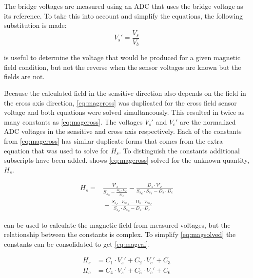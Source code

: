 The bridge voltages are measured using an \ac{ADC} that uses the bridge voltage as its reference. To take this into account and simplify the equations, the following substitution is made:
\begin{equation}
    V_s'=\frac{V_s}{V_b}
    \label{eq:adcsub}
\end{equation}

 is useful to determine the voltage that would be produced for a given magnetic field condition, but not the reverse when the sensor voltages are known but the fields are not.

Because the calculated field in the sensitive direction also depends on the field in the cross axis direction, \cref{eq:magcross} was duplicated for the cross field sensor voltage and both equations were solved simultaneously. This resulted in twice as many constants as \cref{eq:magcross}. The voltages $V_s'$ and $V_c'$ are the normalized \ac{ADC} voltages in the sensitive and cross axis respectively. Each of the constants from \cref{eq:magcross} has similar duplicate forms that comes from the extra equation that was used to solve for $H_s$. To distinguish the constants additional subscripts have been added.  shows \cref{eq:magcross} solved for the unknown quantity, $H_s$.

\begin{equation}
    \begin{split}
    H_s = & \frac{V'_s }{{S_s}_s - \frac{D_s \cdot D_c}{{S_s}_c}} - \frac{D_s \cdot  V'_c }{{S_s}_c \cdot {S_s}_s - D_s \cdot D_c}\\
    & {}- \frac{{S_s}_c \cdot {V_{os}}_s  -D_s \cdot {V_{os}}_c}{{S_s}_c \cdot {S_s}_s - D_s \cdot D_c}
    \end{split}
    \label{eq:magsolved} 
\end{equation}

 can be used to calculate the magnetic field from measured voltages, but the relationship between the constants is complex. To simplify \cref{eq:magsolved} the constants can be consolidated to get \cref{eq:magcal}.

\begin{equation}
    \label{eq:magcal}
    \begin{split}
        H_s &= C_1 \cdot V_s' + C_2 \cdot V_c' + C_3\\
        H_c &= C_4 \cdot V_s' + C_5 \cdot V_c' + C_6
    \end{split}
\end{equation}

